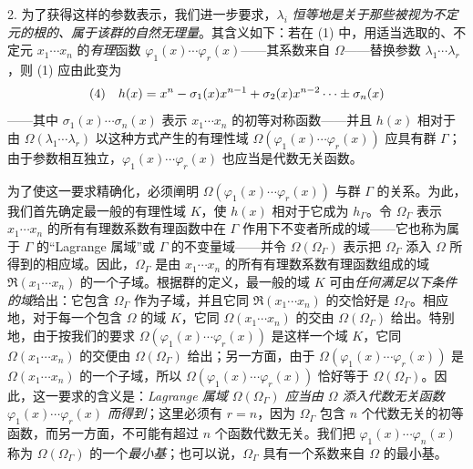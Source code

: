 \documentclass[11pt]{article}
\providecommand{\glqq}{“}
\providecommand{\grqq}{”}
\begin{document}
2. 为了获得这样的参数表示，我们进一步要求，$\lambda_i$ \emph{恒等地是关于那些被视为不定元的根的、属于该群的自然无理量}。其含义如下：若在 (1) 中，用适当选取的、不定元 $x_1\cdots x_n$ 的\emph{有理}函数 $\varphi_1(x)\cdots\varphi_r(x)$——其系数来自 $\Omega$——替换参数 $\lambda_1\cdots\lambda_r$，则 (1) 应由此变为
\[
\begin{array}{@{}l@{\quad}l@{}}
(4)& \displaystyle h(x)=x^n-\sigma_1(x)x^{n-1}+\sigma_2(x)x^{n-2}\cdots\pm\sigma_n(x)
\end{array}
\]
——其中 $\sigma_1(x)\cdots\sigma_n(x)$ 表示 $x_1\cdots x_n$ 的初等对称函数——并且 $h(x)$ 相对于由 $\Omega(\lambda_1\cdots\lambda_r)$ 以这种方式产生的有理性域 $\Omega(\varphi_1(x)\cdots\varphi_r(x))$ 应具有群 $\Gamma$；由于参数相互独立，$\varphi_1(x)\cdots\varphi_r(x)$ 也应当是代数无关函数。

为了使这一要求精确化，必须阐明 $\Omega(\varphi_1(x)\cdots\varphi_r(x))$ 与群 $\Gamma$ 的关系。为此，我们首先确定最一般的有理性域 $K$，使 $h(x)$ 相对于它成为 $h_\Gamma$。令 $\Omega_\Gamma$ 表示 $x_1\cdots x_n$ 的所有有理数系数有理函数中在 $\Gamma$ 作用下不变者所成的域——它也称为属于 $\Gamma$ 的\glqq{}Lagrange 属域\grqq{}或 $\Gamma$ 的不变量域——并令 $\Omega(\Omega_\Gamma)$ 表示把 $\Omega_\Gamma$ 添入 $\Omega$ 所得到的相应域。因此，$\Omega_\Gamma$ 是由 $x_1\cdots x_n$ 的所有有理数系数有理函数组成的域 $\mathfrak R(x_1\cdots x_n)$ 的一个子域。根据群的定义，最一般的域 $K$ 可由\emph{任何满足以下条件的域}给出：它包含 $\Omega_\Gamma$ 作为子域，并且它同 $\mathfrak R(x_1\cdots x_n)$ 的交恰好是 $\Omega_\Gamma$。相应地，对于每一个包含 $\Omega$ 的域 $K$，它同 $\Omega(x_1\cdots x_n)$ 的交由 $\Omega(\Omega_\Gamma)$ 给出。特别地，由于按我们的要求 $\Omega(\varphi_1(x)\cdots\varphi_r(x))$ 是这样一个域 $K$，它同 $\Omega(x_1\cdots x_n)$ 的交便由 $\Omega(\Omega_\Gamma)$ 给出；另一方面，由于 $\Omega(\varphi_1(x)\cdots\varphi_r(x))$ 是 $\Omega(x_1\cdots x_n)$ 的一个子域，所以 $\Omega(\varphi_1(x)\cdots\varphi_r(x))$ 恰好等于 $\Omega(\Omega_\Gamma)$。因此，这一要求的含义是：\emph{Lagrange 属域 $\Omega(\Omega_\Gamma)$ 应当由 $\Omega$ 添入代数无关函数 $\varphi_1(x)\cdots\varphi_r(x)$ 而得到}；这里必须有 $r=n$，因为 $\Omega_\Gamma$ 包含 $n$ 个代数无关的初等函数，而另一方面，不可能有超过 $n$ 个函数代数无关。我们把 $\varphi_1(x)\cdots\varphi_n(x)$ 称为 $\Omega(\Omega_\Gamma)$ 的一个\emph{最小基}；也可以说，$\Omega_\Gamma$ 具有一个系数来自 $\Omega$ 的最小基。
\end{document}
